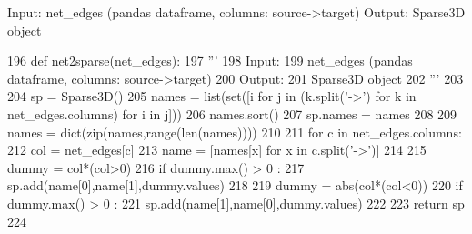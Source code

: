 \begin{DoxyVerb}Input:
    net_edges (pandas dataframe, columns: source->target)
Output:
    Sparse3D object
\end{DoxyVerb}
 
\begin{DoxyCode}
196 \textcolor{keyword}{def }net2sparse(net\_edges):
197     \textcolor{stringliteral}{'''}
198 \textcolor{stringliteral}{    Input:}
199 \textcolor{stringliteral}{        net\_edges (pandas dataframe, columns: source->target)}
200 \textcolor{stringliteral}{    Output:}
201 \textcolor{stringliteral}{        Sparse3D object}
202 \textcolor{stringliteral}{    '''}
203 
204     sp = Sparse3D()
205     names = list(set([i \textcolor{keywordflow}{for} j \textcolor{keywordflow}{in} (k.split(\textcolor{stringliteral}{'->'}) \textcolor{keywordflow}{for} k \textcolor{keywordflow}{in} net\_edges.columns) \textcolor{keywordflow}{for} i \textcolor{keywordflow}{in} j]))
206     names.sort()
207     sp.names = names
208 
209     names = dict(zip(names,range(len(names))))
210 
211     \textcolor{keywordflow}{for} c \textcolor{keywordflow}{in} net\_edges.columns:
212         col = net\_edges[c]
213         name = [names[x] \textcolor{keywordflow}{for} x \textcolor{keywordflow}{in} c.split(\textcolor{stringliteral}{'->'})]
214 
215         dummy = col*(col>0)
216         \textcolor{keywordflow}{if} dummy.max() > 0 :
217             sp.add(name[0],name[1],dummy.values)
218 
219         dummy = abs(col*(col<0))
220         \textcolor{keywordflow}{if} dummy.max() > 0 :
221             sp.add(name[1],name[0],dummy.values)
222 
223     \textcolor{keywordflow}{return} sp
224 \end{DoxyCode}
